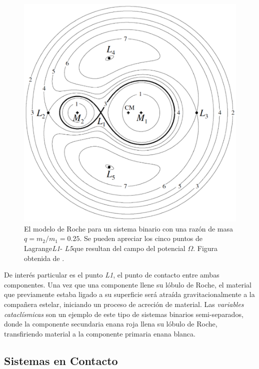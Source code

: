 \begin{figure}[!ht]
	\centering
	\includegraphics[scale=0.34]{Introduccion/Figures/Figura Lagrange_CVs Wide Field Surveys.png}
	\caption{El modelo de Roche para un sistema binario con una razón de masa $q
	= m_2 / m_1 = 0.25$. Se pueden apreciar los cinco puntos de
	Lagrange\textemdash \textit{L1}- \textit{L5}\textemdash que resultan del
	campo del potencial $\Omega$. Figura obtenida de
	\autocite{ibanez_cvs_wide_field_surveys_2021}.}
	\label{figuraLagrange}
\end{figure}

De interés particular es el punto \textit{L1}, el punto de contacto entre ambas
componentes. Una vez que una componente llene su lóbulo de Roche, el material
que previamente estaba ligado a su superficie será atraída gravitacionalmente a
la compañera estelar, iniciando un proceso de acreción de material. Las
\textit{variables cataclísmicas} son un ejemplo de este tipo de sistemas
binarios semi-separados, donde la componente secundaria enana roja llena su
lóbulo de Roche, transfiriendo material a la componente primaria enana blanca.

\subsection{Sistemas en Contacto}

